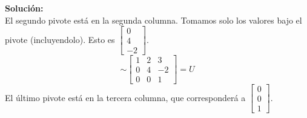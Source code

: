 \documentclass[12pt]{article}
\newenvironment{solucion}
{\begin{mdframed}[backgroundcolor=black!10]
		{\bf Solución:}\\
	}
	{
	\end{mdframed}
}
\newenvironment{preguntas}
{\begin{enumerate}\itemsep12pt
	}
	{
	\end{enumerate}
}
\begin{document}
\begin{preguntas}
\begin{solucion}
		El segundo pivote está en la segunda columna. Tomamos solo los valores bajo el pivote (incluyendolo). Esto es $\begin{bmatrix}0 \\ 4 \\ -2\end{bmatrix}$.
		$$\sim \begin{bmatrix}
		1 & 2 & 3\\
		0 & 4 & -2 \\
		0 & 0 & 1\end{bmatrix} = U$$
		El último pivote está en la tercera columna, que corresponderá a $\begin{bmatrix}0 \\ 0 \\ 1\end{bmatrix}$.
		

\end{solucion}
\end{preguntas}
\end{document}
